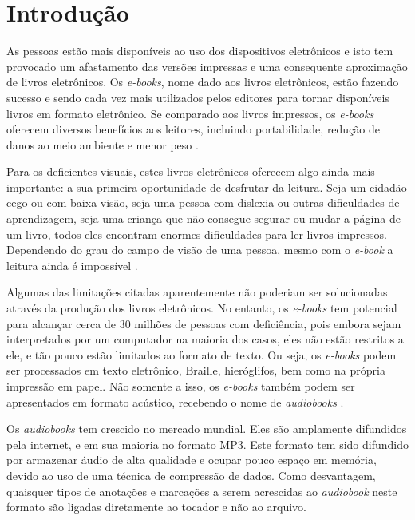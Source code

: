 \chapter[Introdução]{Introdução}\label{cap1}

As pessoas estão mais disponíveis ao uso dos dispositivos eletrônicos e isto tem provocado um afastamento das versões impressas e uma consequente aproximação de livros eletrônicos. Os \textit{e-books}, nome dado aos livros eletrônicos, estão fazendo sucesso e sendo cada vez mais utilizados pelos editores para tornar disponíveis livros em formato eletrônico. Se comparado aos livros impressos, os \textit{e-books} oferecem diversos benefícios aos leitores, incluindo portabilidade, redução de danos ao meio ambiente e menor peso \cite{printdisable}.

Para os deficientes visuais, estes livros eletrônicos oferecem algo ainda mais importante: a sua primeira oportunidade de desfrutar da leitura. Seja um cidadão cego ou com baixa visão, seja uma pessoa com dislexia ou outras dificuldades de aprendizagem, seja uma criança que não consegue segurar ou mudar a página de um livro, todos eles encontram enormes dificuldades para ler livros impressos. Dependendo do grau do campo de visão de uma pessoa, mesmo com o \textit{e-book} a leitura ainda é impossível \cite{ebooks}.

Algumas das limitações citadas aparentemente não poderiam ser solucionadas através da produção dos livros eletrônicos. No entanto, os \textit{e-books} tem potencial para alcançar cerca de 30 milhões de pessoas com deficiência, pois embora sejam interpretados por um computador na maioria dos casos, eles não estão restritos a ele, e tão pouco estão limitados ao formato de texto. Ou seja, os \textit{e-books} podem ser processados em texto eletrônico, Braille, hieróglifos, bem como na própria impressão em papel. Não somente a isso, os \textit{e-books} também podem ser apresentados em formato acústico, recebendo o nome de \textit{audiobooks} \cite{ebooks}.

Os \textit{audiobooks} tem crescido no mercado mundial. Eles são amplamente difundidos pela internet, e em sua maioria no formato MP3. Este formato tem sido difundido por armazenar áudio de alta qualidade e ocupar pouco espaço em memória, devido ao uso de uma técnica de compressão de dados. Como desvantagem, quaisquer tipos de anotações e marcações a serem acrescidas ao \textit{audiobook} neste formato são ligadas diretamente ao tocador e não ao arquivo.

